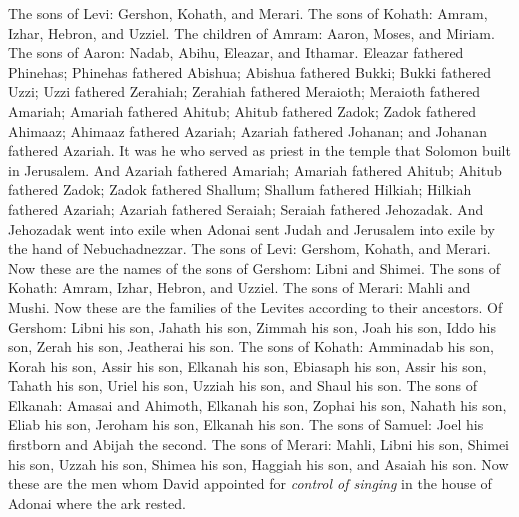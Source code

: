 \begin{biblechapter} %
\verse {} The sons of Levi: Gershon, Kohath, and Merari.
\verse The sons of Kohath: Amram, Izhar, Hebron, and Uzziel.
\verse The children of Amram: Aaron, Moses, and Miriam. The sons of Aaron: Nadab, Abihu, Eleazar, and Ithamar.
\verse Eleazar fathered Phinehas; Phinehas fathered Abishua;
\verse Abishua fathered Bukki; Bukki fathered Uzzi;
\verse Uzzi fathered Zerahiah; Zerahiah fathered Meraioth;
\verse Meraioth fathered Amariah; Amariah fathered Ahitub;
\verse Ahitub fathered Zadok; Zadok fathered Ahimaaz;
\verse Ahimaaz fathered Azariah; Azariah fathered Johanan;
\verse and Johanan fathered Azariah. It was he who served as priest in the temple that Solomon built in Jerusalem.
\verse And Azariah fathered Amariah; Amariah fathered Ahitub;
\verse Ahitub fathered Zadok; Zadok fathered Shallum;
\verse Shallum fathered Hilkiah; Hilkiah fathered Azariah;
\verse Azariah fathered Seraiah; Seraiah fathered Jehozadak.
\verse And Jehozadak went into exile when Adonai sent Judah and Jerusalem into exile by the hand of Nebuchadnezzar.
 The sons of Levi: Gershom, Kohath, and Merari.
\verse Now these are the names of the sons of Gershom: Libni and Shimei.
\verse The sons of Kohath: Amram, Izhar, Hebron, and Uzziel.
\verse The sons of Merari: Mahli and Mushi. Now these are the families of the Levites according to their ancestors.
\verse Of Gershom: Libni his son, Jahath his son, Zimmah his son,
\verse Joah his son, Iddo his son, Zerah his son, Jeatherai his son.
\verse The sons of Kohath: Amminadab his son, Korah his son, Assir his son,
\verse Elkanah his son, Ebiasaph his son, Assir his son,
\verse Tahath his son, Uriel his son, Uzziah his son, and Shaul his son.
\verse The sons of Elkanah: Amasai and Ahimoth,
\verse Elkanah his son, Zophai his son, Nahath his son,
\verse Eliab his son, Jeroham his son, Elkanah his son.
\verse The sons of Samuel: Joel his firstborn and Abijah the second.
\verse The sons of Merari: Mahli, Libni his son, Shimei his son, Uzzah his son,
\verse Shimea his son, Haggiah his son, and Asaiah his son.
 Now these are the men whom David appointed for \textit{control of singing} in the house of Adonai where the ark rested.

\end{biblechapter}
